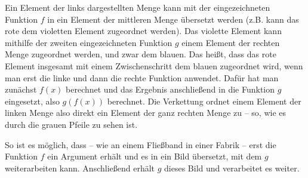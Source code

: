 \documentclass[../../main.tex]{subfiles}
\begin{document}
Ein Element der links dargestellten Menge kann mit der eingezeichneten Funktion $f$ in ein Element der mittleren Menge übersetzt werden (z.B. kann das rote dem violetten Element zugeordnet werden). Das violette Element kann mithilfe der zweiten eingezeichneten Funktion $g$ einem Element der rechten Menge zugeordnet werden, und zwar dem blauen. Das heißt, dass das rote Element insgesamt mit einem Zwischenschritt dem blauen zugeordnet wird, wenn man erst die linke und dann die rechte Funktion anwendet. Dafür hat man zunächst $f(x)$ berechnet und das Ergebnis anschließend in die Funktion $g$ eingesetzt, also $g(f(x))$ berechnet. Die Verkettung ordnet einem Element der linken Menge also direkt ein Element der ganz rechten Menge zu -- so, wie es durch die grauen Pfeile zu sehen ist.

So ist es möglich, dass -- wie an einem Fließband in einer Fabrik -- erst die Funktion $f$ ein Argument erhält und es in ein Bild übersetzt, mit dem $g$ weiterarbeiten kann. Anschließend erhält $g$ dieses Bild und verarbeitet es weiter.
\end{document}
